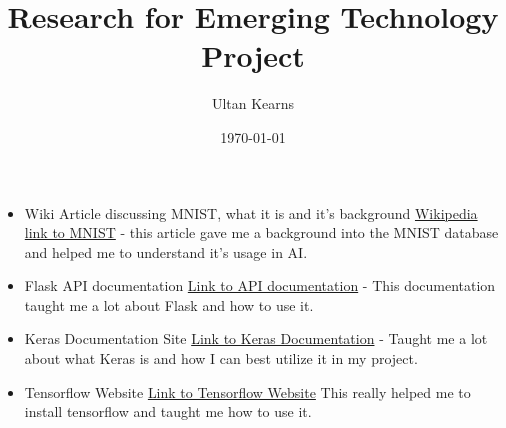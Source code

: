 \documentclass[12pt, letterpaper]{article}
\title{Research for Emerging Technology Project}
\author{Ultan Kearns}
\date{\today}
\begin{document}
\begin{titlepage}
\maketitle
\end{titlepage}
\begin{itemize}
\item Wiki Article discussing MNIST, what it is and it's background
\href{https://en.wikipedia.org/wiki/MNIST_database}{Wikipedia link to MNIST} -
this article gave me a background into the MNIST database and helped me to understand
it's usage in AI.
\item Flask API documentation \href{https://flask.palletsprojects.com/en/1.1.x/}{Link to API documentation} - This documentation taught me a lot about Flask and how to use it.
\item Keras Documentation Site \href{https://keras.io/}{Link to Keras Documentation} - Taught me a lot about what Keras is and how I can best utilize it in my project.
\item Tensorflow Website \href{https://www.tensorflow.org/}{Link to Tensorflow Website} This really helped me to install tensorflow and taught me how to use it.
\end{itemize}
\end{document}
